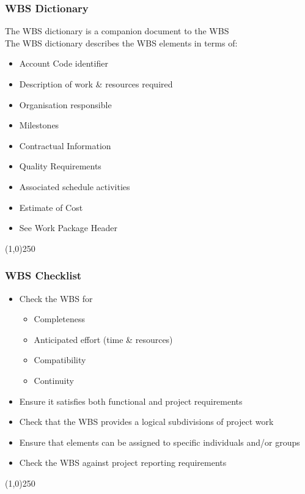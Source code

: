 \begin{frame}
\frametitle{WBS Dictionary}
The WBS dictionary is a companion document to the WBS\\
The WBS dictionary describes the WBS elements in terms of:
\begin{itemize}
	\item Account Code identifier
	\item Description of work \& resources required
	\item Organisation responsible
	\item Milestones
	\item Contractual Information
	\item Quality Requirements
	\item Associated schedule activities
	\item Estimate of Cost
	\item See Work Package Header
\end{itemize}
\end{frame}\begin{center}\line(1,0){250}\end{center}



\begin{frame}
\frametitle{WBS Checklist}
\begin{itemize}
	\item Check the WBS for 
	\begin{itemize}
		\item Completeness 
		\item Anticipated effort (time \& resources)
		\item Compatibility
		\item Continuity
	\end{itemize}
	\item Ensure it satisfies both functional and project requirements
	\item Check that the WBS provides a logical subdivisions of project work
	\item Ensure that elements can be assigned to specific individuals and/or groups
	\item Check the WBS against project reporting requirements
\end{itemize}

\end{frame}\begin{center}\line(1,0){250}\end{center}



